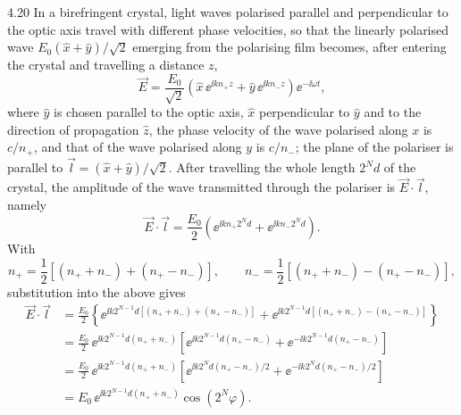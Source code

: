 \begin{solution}{4.20}
In a birefringent crystal, light waves polarised parallel and perpendicular to the optic axis
travel with different phase velocities, so that the linearly polarised wave
$E_0(\hat{x}+\hat{y})/\sqrt{2}$ emerging from the polarising film becomes, after entering the
crystal and travelling a distance $z$,
\begin{equation*}
\vec{E} = \frac{E_0}{\sqrt{2}}
          \left(\hat{x}\,\ee^{\ii k n_+ z} + \hat{y}\,\ee^{\ii k n_- z}\right)\ee^{-\ii\omega t},
\end{equation*}
where $\hat{y}$ is chosen parallel to the optic axis, $\hat{x}$ perpendicular to $\hat{y}$ and
to the direction of propagation $\hat{z}$, the phase velocity of the wave polarised along $x$ is
$c/n_+$, and that of the wave polarised along $y$ is $c/n_-$; the plane of the polariser is
parallel to $\vec{l} = (\hat{x}+\hat{y})/\sqrt{2}$. After travelling the whole length $2^N d$ of
the crystal, the amplitude of the wave transmitted through the polariser is $\vec{E}\cdot\vec{l}$,
namely
\begin{equation*}
\vec{E}\cdot\vec{l}
= \frac{E_0}{2}\left(\ee^{\ii k n_+ 2^N d} + \ee^{\ii k n_- 2^N d}\right).
\end{equation*}
With
\begin{equation*}
n_+ = \frac{1}{2}\left[(n_+ + n_-) + (n_+ - n_-)\right],\qquad
n_- = \frac{1}{2}\left[(n_+ + n_-) - (n_+ - n_-)\right],
\end{equation*}
substitution into the above gives
\begin{align*}
\vec{E}\cdot\vec{l}
&= \frac{E_0}{2}\left\{\ee^{\ii k 2^{N-1}d\left[(n_+ + n_-)+(n_+ - n_-)\right]}
   + \ee^{\ii k 2^{N-1}d\left[(n_+ + n_-)-(n_+ - n_-)\right]}\right\}\\
&= \frac{E_0}{2}\,\ee^{\ii k 2^{N-1}d(n_+ + n_-)}
   \left[\ee^{\ii k 2^{N-1}d(n_+ - n_-)}
   + \ee^{-\ii k 2^{N-1}d(n_+ - n_-)}\right]\\
&= \frac{E_0}{2}\,\ee^{\ii k 2^{N-1}d(n_+ + n_-)}
   \left[\ee^{\ii k 2^N d(n_+ - n_-)/2}
   + \ee^{-\ii k 2^N d(n_+ - n_-)/2}\right]\\
&= E_0\,\ee^{\ii k 2^{N-1}d(n_+ + n_-)}\cos\left(2^N\varphi\right).
\end{align*}
\end{solution}

